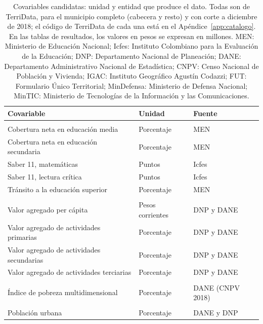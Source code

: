 \begin{table}[!htbp]
\centering
\footnotesize
\caption[Covariables candidatas: unidad y fuente]{Covariables candidatas: unidad y entidad que produce el dato. Todas son de TerriData, para el municipio completo (cabecera y resto) y con corte a diciembre de 2018; el código de TerriData de cada una está en el Apéndice~\ref{app:catalogo}. En las tablas de resultados, los valores en pesos se expresan en millones. MEN: Ministerio de Educación Nacional; Icfes: Instituto Colombiano para la Evaluación de la Educación; DNP: Departamento Nacional de Planeación; DANE: Departamento Administrativo Nacional de Estadística; CNPV: Censo Nacional de Población y Vivienda; IGAC: Instituto Geográfico Agustín Codazzi; FUT: Formulario Único Territorial; MinDefensa: Ministerio de Defensa Nacional; MinTIC: Ministerio de Tecnologías de la Información y las Comunicaciones.}
\label{tab:covariables_datos}
\renewcommand{\arraystretch}{1.1}
\begin{tabularx}{\linewidth}{>{\raggedright\arraybackslash}p{5.6cm} >{\raggedright\arraybackslash}p{3.0cm} >{\raggedright\arraybackslash}X}
\toprule
Covariable & Unidad & Fuente \\
\midrule
\multicolumn{3}{l}{Educación} \\
Cobertura neta en educación media & Porcentaje & MEN \\
Cobertura neta en educación secundaria & Porcentaje & MEN \\
Saber 11, matemáticas & Puntos & Icfes \\
Saber 11, lectura crítica & Puntos & Icfes \\
Tránsito a la educación superior & Porcentaje & MEN \\
\multicolumn{3}{l}{Economía} \\
Valor agregado per cápita & Pesos corrientes & DNP y DANE \\
Valor agregado de actividades primarias & Porcentaje & DNP y DANE \\
Valor agregado de actividades secundarias & Porcentaje & DNP y DANE \\
Valor agregado de actividades terciarias & Porcentaje & DNP y DANE \\
\multicolumn{3}{l}{Pobreza} \\
Índice de pobreza multidimensional & Porcentaje & DANE (CNPV 2018) \\
\multicolumn{3}{l}{Demografía} \\
Población urbana & Porcentaje & DANE y DNP \\

\end{tabularx}
\end{table}
